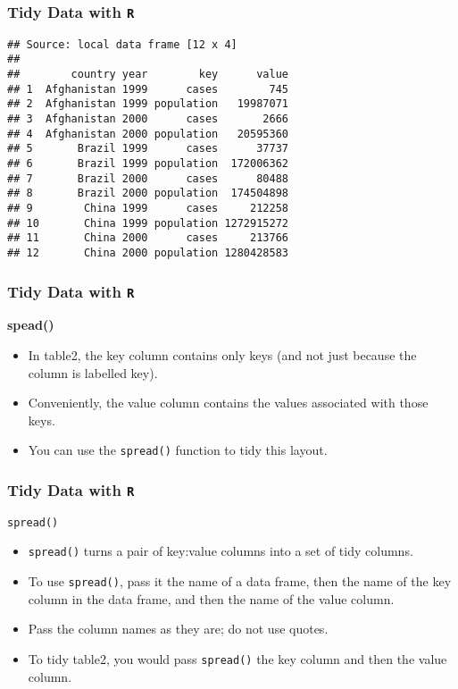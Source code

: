 \documentclass[TIDYMASTER.tex]{subfiles}
\begin{document}
\begin{frame}[fragile]
	\frametitle{Tidy Data with \texttt{R}}
\begin{verbatim}
## Source: local data frame [12 x 4]
## 
##        country year        key      value
## 1  Afghanistan 1999      cases        745
## 2  Afghanistan 1999 population   19987071
## 3  Afghanistan 2000      cases       2666
## 4  Afghanistan 2000 population   20595360
## 5       Brazil 1999      cases      37737
## 6       Brazil 1999 population  172006362
## 7       Brazil 2000      cases      80488
## 8       Brazil 2000 population  174504898
## 9        China 1999      cases     212258
## 10       China 1999 population 1272915272
## 11       China 2000      cases     213766
## 12       China 2000 population 1280428583
\end{verbatim}
\end{frame}
\begin{frame}[fragile]
	\frametitle{Tidy Data with \texttt{R}}
	\Large
\textbf{spead()}
\begin{itemize}
\item	In table2, the key column contains only keys (and not just because the column is labelled key). 
\item Conveniently, the value column contains the values associated with those keys.
\item You can use the \texttt{spread()} function to tidy this layout.
\end{itemize}

\end{frame}
\begin{frame}[fragile]
\frametitle{Tidy Data with \texttt{R}}
\Large
\texttt{spread()}
\begin{itemize}
\item \texttt{spread()} turns a pair of key:value columns into a set of tidy columns. 
\item To use \texttt{spread()}, pass it the name of a data frame, then the name of the key column in the data frame, and then the name of the value column. 
\item Pass the column names as they are; do not use quotes.
\item To tidy table2, you would pass \texttt{spread()} the key column and then the value column.
\end{itemize}
\end{frame}
\end{document}
